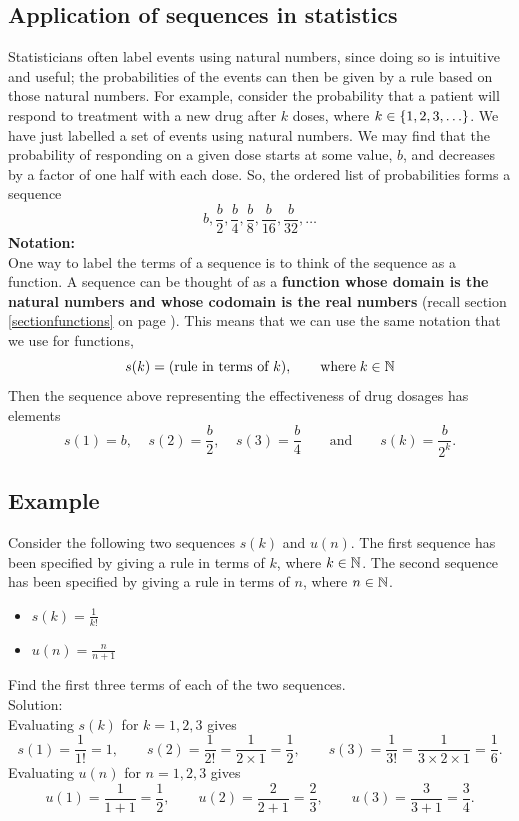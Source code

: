 \subsection{Application of sequences in statistics} \label{ass}
Statisticians often label events using natural numbers, since doing so is intuitive and useful; the probabilities of the events can then be given by a rule based on those natural numbers. For example, consider the probability that a patient will respond to treatment with a new drug after $k$ doses, where $k \in \left\{1,2,3,\ldots\right\}$. We have just labelled a set of events using natural numbers. We may find that the probability of responding on a given dose starts at some value, $b$, and decreases by a factor of one half with each dose. So, the ordered list of probabilities forms a sequence
\[
b,\frac{b}{2}, \frac{b}{4}, \frac{b}{8}, \frac{b}{16}, \frac{b}{32}, \ldots
\]
\textbf{Notation:} \\
One way to label the terms of a sequence is to think of the sequence as a function. A sequence can be thought of as a \textbf{function whose domain is the natural numbers and whose codomain is the real numbers} (recall section \ref{sectionfunctions} on page \pageref{sectionfunctions}). This means that we can use the same notation that we use for functions,
\[
s(k) = (\text{rule in terms of $k$}), \qquad \text{where} \; k \in \mathbb{N} \label{s(k)}
\]
Then the sequence above representing the effectiveness of drug dosages has elements
\[
s(1) = b,\;\;\;\; s(2) = \frac{b}{2}, \;\;\;\; s(3) = \frac{b}{4} \qquad \text{and} \qquad s(k) = \frac{b}{2^k}.
\]
\subsection{Example} \label{s(k)u(n)}
Consider the following two sequences $s(k)$ and $u(n)$. The first sequence has been specified by giving a rule in terms of $k$, where $k \in \mathbb{N}$. The second sequence has been specified by giving a rule in terms of $n$, where $n \in \mathbb{N}$.
\begin{itemize}
\item
$s(k) = \displaystyle{\frac{1}{k!}}$
\item
$u(n) = \displaystyle{\frac{n}{n+1}}$
\end{itemize}
Find the first three terms of each of the two sequences. \\

Solution: \\
Evaluating $s(k)$ for $k = 1,2,3$ gives
\[
s(1) = \frac{1}{1!} = 1, \qquad s(2) = \frac{1}{2!} = \frac{1}{2\times 1} = \frac{1}{2}, \qquad s(3) = \frac{1}{3!} = \frac{1}{3\times 2 \times 1} = \frac{1}{6}.
\]
Evaluating $u(n)$ for $n = 1,2,3$ gives
\[
u(1) = \frac{1}{1+1} = \frac{1}{2}, \qquad u(2) = \frac{2}{2+1} = \frac{2}{3},\qquad u(3) = \frac{3}{3+1} = \frac{3}{4}.
\]



